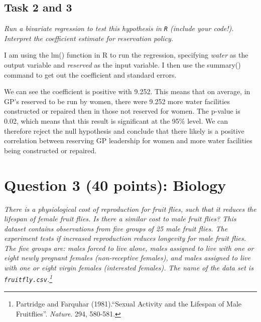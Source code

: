 \documentclass[12pt,a4paper]{article}
\begin{document}
\subsection*{Task 2 and 3}
\textit{Run a bivariate regression to test this hypothesis in \texttt{R} (include your code!). Interpret the coefficient estimate for reservation policy.}

I am using the lm() function in R to run the regression, specifying \textit{water} as the output variable and \textit{reserved} as the input variable. I then use the summary() command to get out the coefficient and standard errors.



We can see the coefficient is positive with 9.252. This means that on average, in GP's reserved to be run by women, there were 9.252 more water facilities constructed or repaired then in those not reserved for women. The p-value is 0.02, which means that this result is significant at the 95\% level. We can therefore reject the null hypothesis and conclude that there likely is a positive correlation between reserving GP leadership for women and more water facilities being constructed or repaired.

\newpage
\section*{Question 3 (40 points): Biology}

\textit{There is a physiological cost of reproduction for fruit flies, such that it reduces the lifespan of female fruit flies.  Is there a similar cost to male fruit flies?  This dataset contains observations from five groups of 25 male fruit flies. The experiment tests if increased reproduction reduces longevity for male fruit flies. The five groups are: males forced to live alone, males assigned to live with one or eight newly pregnant females (non-receptive females), and males assigned to live with one or eight virgin females (interested females). The name of the data set is \texttt{fruitfly.csv}.\footnote{Partridge and Farquhar (1981).``Sexual Activity and the Lifespan of Male Fruitflies''. \textit{Nature}. 294, 580-581.}}
\vspace{1cm}
\end{document}
